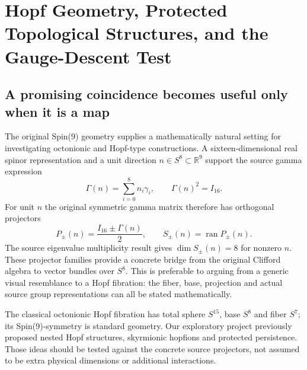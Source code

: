 \chapter[Hopf Geometry and Gauge Descent]{Hopf Geometry, Protected Topological Structures, and the Gauge-Descent Test}
\label{ch:unification-topology}

\section{A promising coincidence becomes useful only when it is a map}
The original Spin(9) geometry supplies a mathematically natural setting
for investigating octonionic and Hopf-type constructions. A
sixteen-dimensional real spinor representation and a unit direction
$n\in S^8\subset\mathbb R^9$ support the source gamma expression
\begin{equation}\label{eq:hopf-source-gamma}
  \Gamma(n)=\sum_{i=0}^{8}n_i\gamma_i,
  \qquad \Gamma(n)^2=I_{16}.
\end{equation}
For unit $n$ the original symmetric gamma matrix therefore has
orthogonal projectors
\begin{equation}\label{eq:hopf-eigen-projectors}
 P_\pm(n)=\frac{I_{16}\pm\Gamma(n)}2,
 \qquad S_\pm(n)=\operatorname{ran}P_\pm(n).
\end{equation}
The source eigenvalue multiplicity result gives $\dim S_\pm(n)=8$
for nonzero $n$. These projector families provide a concrete bridge
from the original Clifford algebra to vector bundles over $S^8$.
This is preferable to arguing from a generic visual resemblance to a
Hopf fibration: the fiber, base, projection and actual source group
representations can all be stated mathematically.

The classical octonionic Hopf fibration has total sphere $S^{15}$,
base $S^8$ and fiber $S^7$; its Spin(9)-symmetry is standard
geometry. Our exploratory project previously proposed nested Hopf
structures, skyrmionic hopfions and protected persistence. Those ideas
should be tested against the concrete source projectors, not
assumed to be extra physical dimensions or additional interactions.


